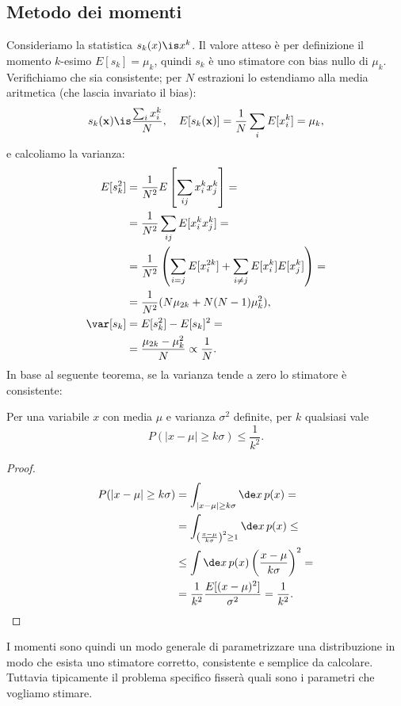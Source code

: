 
\subsection{Metodo dei momenti}

Consideriamo la statistica $s_k(x)\is x^k$.
Il valore atteso è per definizione il momento $k$-esimo
$E[s_k]=\mu_k$,
quindi $s_k$ è uno stimatore con bias nullo di $\mu_k$.
Verifichiamo che sia consistente;
per $N$ estrazioni lo estendiamo alla media aritmetica (che lascia invariato il bias):
\begin{align*}
	s_k(\mathbf x)
	\is \frac{\sum_i x_i^k}N, \quad
	E[s_k(\mathbf x)]
	= \frac1N \sum_i E[x_i^k]
	= \mu_k,
\end{align*}
e calcoliamo la varianza:
\begin{align*}
	E[s_k^2]
	&= \frac1{N^2} E \left[ \sum_{ij} x_i^k x_j^k \right] = \\
	&= \frac1{N^2} \sum_{ij} E[x_i^k x_j^k] = \\
	&= \frac1{N^2} \left( \sum_{i=j} E[x_i^{2k}] + \sum_{i\neq j} E[x_i^k] E[x_j^k] \right) = \\
	&= \frac1{N^2} (N\mu_{2k} + N(N-1)\mu_k^2), \\
	\var[s_k]
	&= E[s_k^2] - E[s_k]^2 = \\
	&= \frac{\mu_{2k} - \mu_k^2}N
	\propto \frac1N.
\end{align*}
In base al seguente teorema, se la varianza tende a zero lo stimatore è consistente:
\begin{theorem}
	Per una variabile $x$ con media $\mu$ e varianza $\sigma^2$ definite, per $k$ qualsiasi vale
	\begin{equation*}
		P(|x-\mu| \ge k\sigma) \le \frac1{k^2}.
	\end{equation*}
\end{theorem}
\begin{proof}
	\begin{align*}
		P(|x-\mu| \ge k\sigma)
		&= \int_{|x-\mu| \ge k\sigma} \de x\, p(x) = \\
		&= \int_{\left( \frac {x-\mu} {k\sigma} \right)^2 \ge 1} \de x\, p(x) \le \\
		&\le \int \de x\, p(x) \left( \frac {x-\mu} {k\sigma} \right)^2 = \\
		&= \frac 1{k^2} \frac{E[(x-\mu)^2]}{\sigma^2} = \frac 1 {k^2}. \qedhere
	\end{align*}
\end{proof}
I momenti sono quindi un modo generale di parametrizzare una distribuzione in modo che esista uno stimatore corretto, consistente e semplice da calcolare.
Tuttavia tipicamente il problema specifico fisserà quali sono i parametri che vogliamo stimare.

